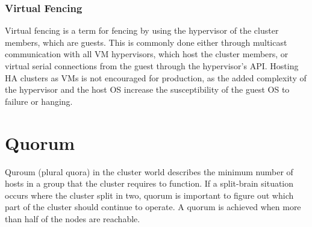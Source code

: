 \subsubsection{Virtual Fencing}
Virtual fencing is a term for fencing by using the hypervisor of the cluster members,
which are guests. This is commonly done either through multicast communication with all
\ac{VM} hypervisors, which host the cluster members, or virtual serial connections
from the guest through the hypervisor's \ac{API}. Hosting \ac{HA} clusters
as \acp{VM} is not encouraged for production, as the added complexity of the hypervisor
and the host \ac{OS} increase the susceptibility of the guest \ac{OS} to failure
or hanging.

% 

\section{Quorum}
Quroum (plural quora) in the cluster world describes the minimum number
of hosts in a group that the cluster requires to function. If a split-brain situation
occurs where the cluster split in two, quorum is important to figure
out which part of the cluster should continue to operate.
A quorum is achieved when more than half of the nodes are reachable.
